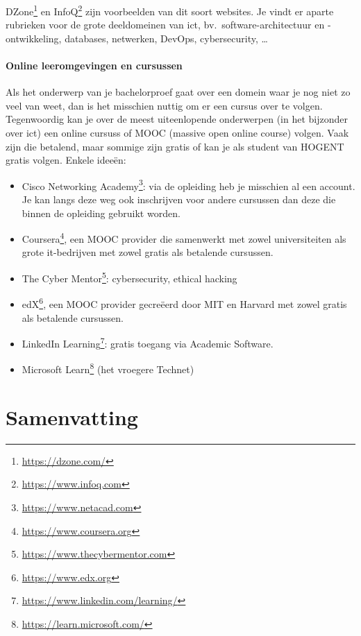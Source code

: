 DZone\footnote{\url{https://dzone.com/}} en InfoQ\footnote{\url{https://www.infoq.com}} zijn voorbeelden van dit soort websites. Je vindt er aparte rubrieken voor de grote deeldomeinen van ict, bv.\ software-architectuur en -ont\-wik\-ke\-ling, databases, netwerken, DevOps, cybersecurity, \ldots

\paragraph{Online leeromgevingen en cursussen}

Als het onderwerp van je bachelorproef gaat over een domein waar je nog niet zo veel van weet, dan is het misschien nuttig om er een cursus over te volgen. Tegenwoordig kan je over de meest uiteenlopende onderwerpen (in het bijzonder over ict) een online cursuss of MOOC (massive open online course) volgen. Vaak zijn die betalend, maar sommige zijn gratis of kan je als student van HOGENT gratis volgen. Enkele ideeën:

\begin{itemize}
  \item Cisco Networking Academy\footnote{\url{https://www.netacad.com}}: via de opleiding heb je misschien al een account. Je kan langs deze weg ook inschrijven voor andere cursussen dan deze die binnen de opleiding gebruikt worden.
  \item Coursera\footnote{\url{https://www.coursera.org}}, een MOOC provider die samenwerkt met zowel universiteiten als grote it-bedrijven met zowel gratis als betalende cursussen.
  \item The Cyber Mentor\footnote{\url{https://www.thecybermentor.com}}: cybersecurity, ethical hacking
  \item edX\footnote{\url{https://www.edx.org}}, een MOOC provider gecreëerd door MIT en Harvard met zowel gratis als betalende cursussen.
  \item LinkedIn Learning\footnote{\url{https://www.linkedin.com/learning/}}: gratis toegang via Academic Software.
  \item Microsoft Learn\footnote{\url{https://learn.microsoft.com/}} (het vroegere Technet)
\end{itemize}


\section{Samenvatting}%
\label{sec:literatuuronderzoek_samenvatting}

